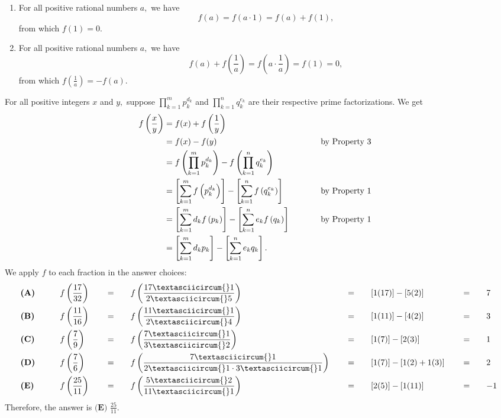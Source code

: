 \begin{enumerate}
\begin{enumerate}
        \item For all positive rational numbers $a,$ we have 
 \[f(a)=f(a\cdot1)=f(a)+f(1),\] from which $f(1)=0.$

        \item For all positive rational numbers $a,$ we have 
 \[f(a)+f\left(\frac1a\right)=f\left(a\cdot\frac1a\right)=f(1)=0,\] from which $f\left({\frac 1a}\right)=-f(a).$

            \end{enumerate}
            For all positive integers $x$ and $y,$ suppose $\prod_{k=1}^{m}p_k^{d_k}$ and $\prod_{k=1}^{n}q_k^{e_k}$ are their respective prime factorizations. We get
 \begin{align*} f\left(\frac xy\right)&=f(x)+f\left(\frac 1y\right) \\ &=f(x)-f(y) && \hspace{10mm}\text{by Property 3} \\ &=f\left(\prod_{k=1}^{m}p_k^{d_k}\right)-f\left(\prod_{k=1}^{n}q_k^{e_k}\right) \\ &=\left[\sum_{k=1}^{m}f\left(p_k^{d_k}\right)\right]-\left[\sum_{k=1}^{n}f\left(q_k^{e_k}\right)\right] && \hspace{10mm}\text{by Property 1} \\ &=\left[\sum_{k=1}^{m}d_k f\left(p_k\right)\right]-\left[\sum_{k=1}^{n}e_k f\left(q_k\right)\right] && \hspace{10mm}\text{by Property 1} \\ &=\left[\sum_{k=1}^{m}d_k p_k \right]-\left[\sum_{k=1}^{n}e_k q_k \right]. \end{align*}
We apply $f$ to each fraction in the answer choices:
 \begin{alignat*}{10} &\textbf{(A)} \qquad && f\left(\frac{17}{32}\right) \quad && = \quad && f\left(\frac{17\textasciicircum{}1}{2\textasciicircum{}5}\right) \quad && = \quad && [1(17)]-[5(2)] \quad && = \quad && 7 \\  &\textbf{(B)} \qquad && f\left(\frac{11}{16}\right) \quad && = \quad && f\left(\frac{11\textasciicircum{}1}{2\textasciicircum{}4}\right) \quad && = \quad && [1(11)]-[4(2)] \quad && = \quad && 3 \\  &\textbf{(C)} \qquad && f\left(\frac{7}{9}\right) \quad && = \quad && f\left(\frac{7\textasciicircum{}1}{3\textasciicircum{}2}\right)  \quad && = \quad && [1(7)]-[2(3)]  \quad && = \quad && 1 \\  &\textbf{(D)} \qquad && f\left(\frac{7}{6}\right) \quad && = \quad && f\left(\frac{7\textasciicircum{}1}{2\textasciicircum{}1\cdot3\textasciicircum{}1}\right) \quad && = \quad && [1(7)]-[1(2)+1(3)] \quad && = \quad && 2 \\ &\textbf{(E)} \qquad && f\left(\frac{25}{11}\right) \quad && = \quad && f\left(\frac{5\textasciicircum{}2}{11\textasciicircum{}1}\right) \quad && = \quad && [2(5)]-[1(11)] \quad && = \quad && {-}1 \end{alignat*}Therefore, the answer is $\boxed{\textbf{(E) }\frac{25}{11}}.$





\end{enumerate}

